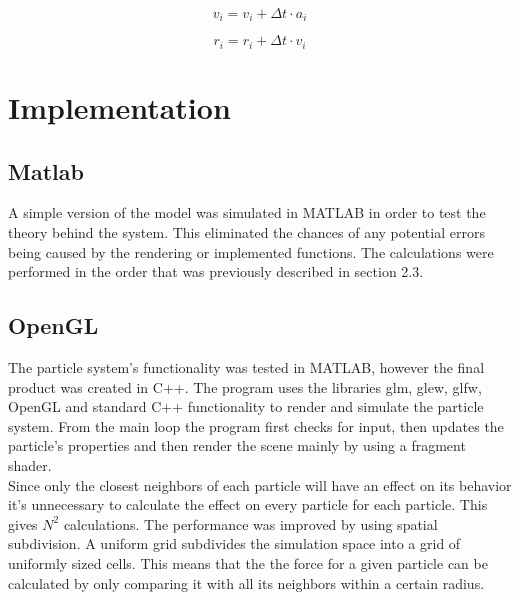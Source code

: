 \documentclass[a4paper,12pt,twoside,final]{report}
\begin{document}
\begin{enumerate}
\noindent \begin{equation}
{v_i} = {v_i + \Delta t \cdot a_i}
\label{e8}
\end{equation}

\noindent \begin{equation}
{r_i} = {r_i + \Delta t \cdot v_i}
\label{e9}
\end{equation}

\end{enumerate}


\chapter{Implementation}

\section{Matlab}
A simple version of the model was simulated in MATLAB in order to test the theory behind the system. This eliminated the chances of any potential errors being caused by the rendering or implemented functions. The calculations were performed in the order that was previously described in section 2.3.

\section{OpenGL}
The particle system’s functionality was tested in MATLAB, however the final product was created in C++. The program uses the libraries glm, glew, glfw, OpenGL and standard C++ functionality to render and simulate the particle system. From the main loop the program first checks for input, then updates the particle’s properties and then render the scene mainly by using a fragment shader. \\

\noindent Since only the closest neighbors of each particle will have an effect on its behavior it’s unnecessary to calculate the effect on every particle for each particle. This gives $N^2$ calculations. The performance was improved by using spatial subdivision. A uniform grid subdivides the simulation space into a grid of uniformly sized cells. This means that the the force for a given particle can be calculated by only comparing it with all its neighbors within a certain radius. \\
\end{document}
